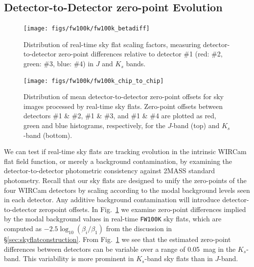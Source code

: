 \documentclass[iop]{emulateapj}
\newcommand{\Fig}[1]{Fig.~\ref{fig:#1}}  %
\newcommand{\Sec}[1]{\S\ref{sec:#1}}  %
\begin{document}
\subsection{Detector-to-Detector zero-point Evolution}
\label{sec:detector_zp}

\begin{figure}[t]
\centering
\texttt{[image: figs/fw100k/fw100k\_betadiff]}
\caption{Distribution of real-time sky flat scaling factors, measuring detector-to-detector zero-point differences relative to detector \#1 (red: \#2, green: \#3, blue: \#4) in $J$ and $K_s$ bands.
}
\label{fig:fw100k_zpdiff}
\end{figure}

\begin{figure}[t]
\centering
\texttt{[image: figs/fw100k/fw100k\_chip\_to\_chip]}
\caption{Distribution of mean detector-to-detector zero-point offsets for sky images processed by real-time sky flats.
Zero-point offsets between detectors \#1 \& \#2, \#1 \& \#3, and \#1 \& \#4 are plotted as
red, green and blue histograms, respectively, for the $J$-band (top) and $K_s$-band (bottom).}
\label{fig:fw100k_chip_to_chip}
\end{figure}

We can test if real-time sky flats are tracking evolution in the intrinsic WIRCam flat field function, or merely a background contamination, by examining the detector-to-detector photometric consistency against 2MASS standard photometry.
Recall that our sky flats are designed to unify the zero-points of the four WIRCam detectors by scaling according to the modal background levels seen in each detector.
Any additive background contamination will introduce detector-to-detector zeropoint offsets.
In \Fig{fw100k_zpdiff} we examine zero-point differences implied by the modal background values in real-time \texttt{FW100K} sky flats, which are computed as $-2.5 \log_{10}(\beta_i / \beta_1)$ from the discussion in \Sec{skyflatconstruction}.
From \Fig{fw100k_zpdiff} we see that the estimated zero-point differences between detectors can be variable over a range of 0.05~mag in the $K_s$-band.
This variability is more prominent in $K_s$-band sky flats than in $J$-band.
\end{document}
